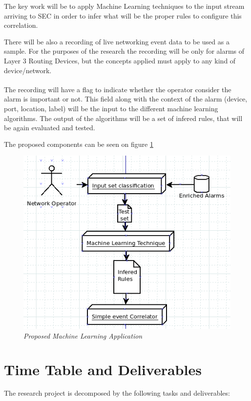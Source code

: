 \documentclass[10pt,a4paper]{article}
\begin{document}
The key work will be to apply Machine Learning techniques to the input stream arriving to SEC in order to infer what will be the proper rules to configure this correlation.

There will be also a recording of live networking event data to be used as a sample. For the purposes of the research the recording will be only for alarms of Layer 3 Routing Devices, but the concepts applied must apply to any kind of device/network.
\\\\
The recording will have a flag to indicate whether the operator consider the alarm is important or not. This field along with the context of the alarm (device, port, location, label) will be the input to the different machine learning algorithms. The output of the algorithms will be a set of infered rules, that will be again evaluated and tested.

The proposed components can be seen on figure \ref{fig:ml_componentdiagram}

\begin{figure}[H]
 \includegraphics[scale=0.7]{ML_ProposedComponents.png}
  \centering
  \caption{\textit{Proposed Machine Learning Application}}
  \label{fig:ml_componentdiagram}
\end{figure}	

  \section{Time Table and Deliverables}
The research project is decomposed by the following tasks and deliverables:
\end{document}
